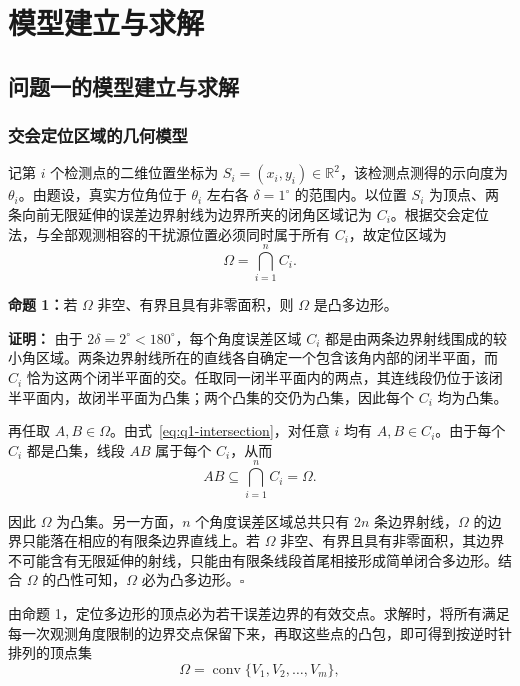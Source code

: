 \documentclass[withoutpreface,bwprint]{cumcmthesis}
\begin{document}
\section{模型建立与求解}

\subsection{问题一的模型建立与求解}

\subsubsection{交会定位区域的几何模型}

记第 $i$ 个检测点的二维位置坐标为 $S_i=(x_i,y_i)\in\mathbb{R}^2$，该检测点测得的示向度为 $\theta_i$。由题设，真实方位角位于 $\theta_i$ 左右各 $\delta=1^\circ$ 的范围内。以位置 $S_i$ 为顶点、两条向前无限延伸的误差边界射线为边界所夹的闭角区域记为 $C_i$。根据交会定位法，与全部观测相容的干扰源位置必须同时属于所有 $C_i$，故定位区域为
\begin{equation}
  \Omega=\bigcap_{i=1}^{n}C_i.
  \label{eq:q1-intersection}
\end{equation}

\noindent\textbf{命题 1：}{\kaishu 若 $\Omega$ 非空、有界且具有非零面积，则 $\Omega$ 是凸多边形。}

\noindent\textbf{证明：}
由于 $2\delta=2^\circ<180^\circ$，每个角度误差区域 $C_i$ 都是由两条边界射线围成的较小角区域。两条边界射线所在的直线各自确定一个包含该角内部的闭半平面，而 $C_i$ 恰为这两个闭半平面的交。任取同一闭半平面内的两点，其连线段仍位于该闭半平面内，故闭半平面为凸集；两个凸集的交仍为凸集，因此每个 $C_i$ 均为凸集。

再任取 $A,B\in\Omega$。由式~\eqref{eq:q1-intersection}，对任意 $i$ 均有 $A,B\in C_i$。由于每个 $C_i$ 都是凸集，线段 $AB$ 属于每个 $C_i$，从而
\begin{equation}
  AB\subseteq\bigcap_{i=1}^{n}C_i=\Omega.
\end{equation}

因此 $\Omega$ 为凸集。另一方面，$n$ 个角度误差区域总共只有 $2n$ 条边界射线，$\Omega$ 的边界只能落在相应的有限条边界直线上。若 $\Omega$ 非空、有界且具有非零面积，其边界不可能含有无限延伸的射线，只能由有限条线段首尾相接形成简单闭合多边形。结合 $\Omega$ 的凸性可知，$\Omega$ 必为凸多边形。\hfill$\square$

由命题 1，定位多边形的顶点必为若干误差边界的有效交点。求解时，将所有满足每一次观测角度限制的边界交点保留下来，再取这些点的凸包，即可得到按逆时针排列的顶点集
\begin{equation}
  \Omega=\operatorname{conv}\{V_1,V_2,\ldots,V_m\},
  \label{eq:q1-convex-hull}
\end{equation}
\end{document}
